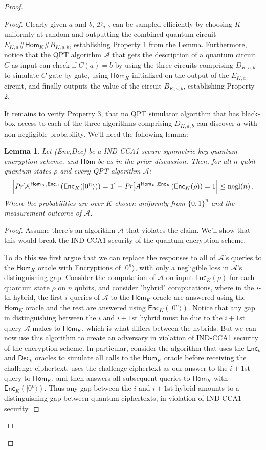 \documentclass[11pt]{article}
\numberwithin{equation}{section}
\newtheorem{lemma}[theorem]{Lemma}
\newcommand{\opn}{\operatorname}
\newcommand{\algo}{\mathcal}
\newcommand{\negl}{\opn{negl}}
\newcommand{\Enc}{\ensuremath{\mathsf{Enc}}\xspace}
\newcommand{\Dec}{\ensuremath{\mathsf{Dec}}\xspace}
\newcommand{\Homorcl}{\ensuremath{\mathsf{Hom}}\xspace}
\begin{document}
{\begin{proof}
\begin{proof}
Clearly given $a$ and $b$, $\mathcal{D}_{a,b}$ can be sampled efficiently by choosing $K$ uniformly at random and outputting the combined quantum circuit $E_{K,a}\#\Homorcl_{K}\#B_{K,a,b}$, establishing Property 1 from the Lemma.  Furthermore, notice that the QPT algorithm $\algo{A}$ that gets the description of a quantum circuit $C$ as input can check if $C(a)=b$ by using the three circuits comprising $D_{K,a,b}$ to simulate $C$ gate-by-gate, using $\Homorcl_K$ initialized on the output of the $E_{K,a}$ circuit, and finally outputs the value of the circuit $B_{K,a,b}$, establishing Property 2.  

It remains to verify Property 3, that no QPT simulator algorithm that has black-box access to  each of the three algorithms comprising $D_{K,a,b}$ can discover $a$ with non-negligible probability.  We'll need the following lemma:
\begin{lemma}\label{hybrid-lemma}
Let (Enc,Dec) be a IND-CCA1-secure symmetric-key quantum encryption scheme, and $\Homorcl$ be as in the prior discussion.  Then, for all $n$ qubit quantum states $\rho$ and every QPT algorithm $\algo{A}$:
$$
\Bigl| \emph{Pr}[\mathcal A^{\Homorcl_K,\Enc_K}(\Enc_K(|0^n\rangle)) = 1] - \emph{Pr}\bigl[\mathcal A^{\Homorcl_K,\Enc_K}(\Enc_K(\rho)) = 1 \Bigr| \leq \negl(n)\,.
$$
Where the probabilities are over $K$ chosen uniformly from $\{0,1\}^n$ and the measurement outcome of $\algo{A}$.
\end{lemma}
\begin{proof}
Assume there's an algorithm $\algo{A}$ that violates the claim.  We'll show that this would break the IND-CCA1 security of the quantum encryption scheme.

To do this we first argue that we can replace the responses to all of $\algo{A}$'s queries to the $\Homorcl_K$ oracle with Encryptions of $|0^n\rangle$, with only a negligible loss in $\algo{A}$'s distinguishing gap.  Consider the computation of $\algo{A}$ on input $\Enc_K(\rho)$ for each quantum state $\rho$ on $n$ qubits, and consider "hybrid" computations, where in the $i$-th hybrid, the first $i$ queries of $\algo{A}$ to the $\Homorcl_K$ oracle are answered using the $\Homorcl_K$ oracle and the rest are answered using $\Enc_K(|0^n\rangle)$.  Notice that any gap in distinguishing between the $i$ and $i+1$st hybrid must be due to the $i+1$st query $\algo{A}$ makes to $\Homorcl_K$, which is what differs between the hybrids. But we can now use this algorithm to create an adversary in violation of IND-CCA1 security of the encryption scheme.  In particular, consider the algorithm that uses the $\Enc_k$ and $\Dec_k$ oracles to simulate all calls to the $\Homorcl_K$ oracle before receiving the challenge ciphertext, uses the challenge ciphertext as our answer to the $i+1$st query to $\Homorcl_K$, and then answers all subsequent queries to $\Homorcl_K$ with $\Enc_K(|0^n\rangle)$.  Thus any gap between the $i$ and $i+1$st hybrid amounts to a distinguishing gap between quantum ciphertexts, in violation of IND-CCA1 security.


\end{proof}
\end{proof}
\end{proof}}
\end{document}
